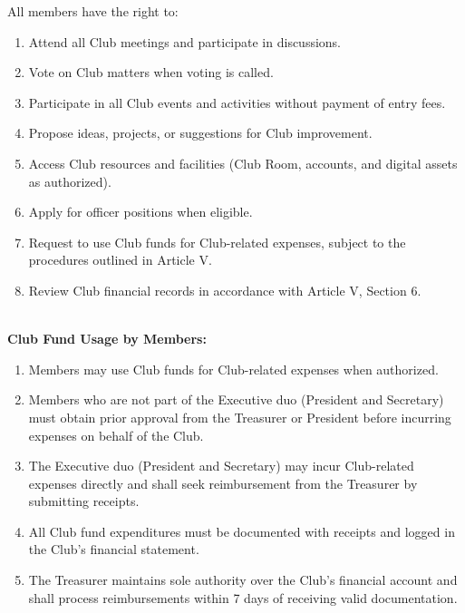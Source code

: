 
All members have the right to:
\begin{enumerate}[label=\alph*), leftmargin=2em, itemsep=0.3em]
    \item Attend all Club meetings and participate in discussions.
    \item Vote on Club matters when voting is called.
    \item Participate in all Club events and activities without payment of entry fees.
    \item Propose ideas, projects, or suggestions for Club improvement.
    \item Access Club resources and facilities (Club Room, accounts, and digital assets as authorized).
    \item Apply for officer positions when eligible.
    \item Request to use Club funds for Club-related expenses, subject to the procedures outlined in Article V.
    \item Review Club financial records in accordance with Article V, Section 6.
\end{enumerate}
\\
\textbf{Club Fund Usage by Members:}
\begin{enumerate}[label=\alph*), leftmargin=2em, itemsep=0.3em]
    \item Members may use Club funds for Club-related expenses when authorized.
    \item Members who are not part of the Executive duo (President and Secretary) must obtain prior approval from the Treasurer or President before incurring expenses on behalf of the Club.
    \item The Executive duo (President and Secretary) may incur Club-related expenses directly and shall seek reimbursement from the Treasurer by submitting receipts.
    \item All Club fund expenditures must be documented with receipts and logged in the Club's financial statement.
    \item The Treasurer maintains sole authority over the Club's financial account and shall process reimbursements within 7 days of receiving valid documentation.
\end{enumerate}


